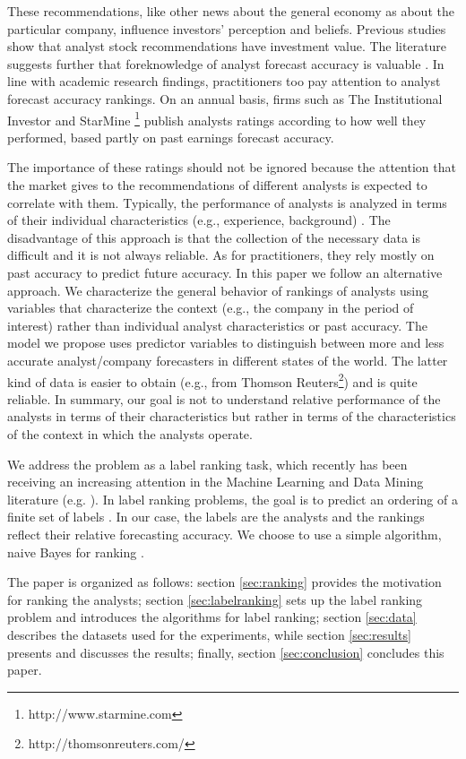 \documentclass{article}\usepackage[]{graphicx}\usepackage[]{color}
\begin{document}
These recommendations, like other news about the general economy as about the particular company, influence investors' perception and beliefs. Previous studies show that analyst stock recommendations have investment value. The literature suggests further that foreknowledge of analyst forecast accuracy is valuable \citep{brown2003}. In line with academic research findings, practitioners too pay attention to analyst forecast accuracy rankings. On an annual basis, firms such as The Institutional Investor and StarMine \footnote{http://www.starmine.com} publish analysts ratings according to how well they performed, based partly on past earnings forecast accuracy. 

The importance of these ratings should not be ignored because the attention that the market gives to the recommendations of different analysts is expected to correlate with them. Typically, the performance of analysts is analyzed in terms of their individual characteristics (e.g., experience, background) \citep{clement1999}. The disadvantage of this approach is that the collection of the necessary data is difficult and it is not always reliable. As for practitioners, they rely mostly on past accuracy to predict future accuracy. In this paper we follow an alternative approach. We characterize the general behavior of rankings of analysts using variables that characterize the context (e.g., the company in the period of interest) rather than individual analyst characteristics or past accuracy. The model we propose uses predictor variables to distinguish between more and less accurate analyst/company forecasters in different states of the world. The latter kind of data is easier to obtain (e.g., from Thomson Reuters\footnote{http://thomsonreuters.com/}) and is quite reliable. In summary, our goal is not to understand  relative performance of the analysts  in terms of their characteristics but rather in terms of the characteristics of the context in which the analysts operate.


We address the problem as a label ranking task, which recently has been receiving an increasing attention in the Machine Learning and Data Mining literature (e.g. \citep{hullermeier,cheng2009}). In label ranking problems,  the goal is to predict an ordering of a finite set of labels \citep{vembu2009}. In our case, the labels are the analysts and the rankings reflect their relative forecasting accuracy.  We choose to use a simple algorithm, naive Bayes for ranking \citep{aiguzhinov2010}. 

The paper is organized as follows: section \ref{sec:ranking} provides the motivation for ranking the analysts; section \ref{sec:labelranking} sets up the label ranking problem and introduces the algorithms for label ranking; section \ref{sec:data} describes the datasets used for the experiments, while section \ref{sec:results} presents and discusses the results; finally, section \ref{sec:conclusion} concludes this paper.
\end{document}
